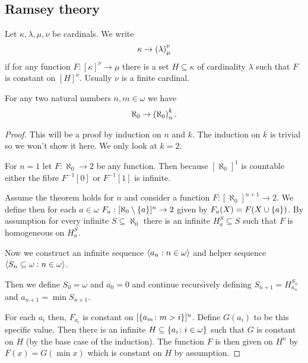 \subsection{Ramsey theory}

\begin{definition}
    Let \(\kappa,\lambda,\mu,\nu\) be cardinals. We write
    \[
        \kappa\to\left(\lambda\right)_{\mu}^{\nu}
    \]
    if for any function \(F:[\kappa]^{\nu}\to\mu\) there is a set
    \(H\subseteq\kappa\) of cardinality \(\lambda\) such that \(F\) is constant
    on \([H]^{\nu}\). Usually \(\nu\) is a finite cardinal.
\end{definition}

\begin{proposition}
    For any two natural numbers \(n,m\in\omega\) we have
    \[
        \aleph_{0}\to\left(\aleph_{0}\right)_{n}^{k}.
    \]

    \begin{proof}
        This will be a proof by induction on \(n\) and \(k\). The induction on
        \(k\) is trivial so we won't show it here. We only look at \(k=2\).

        For \(n=1\) let \(F:\aleph_{0}\to 2\) be any function. Then because
        \([\aleph_{0}]^{1}\) is countable either the fibre \(F^{-1}[0]\) or
        \(F^{-1}[1]\) is infinite.

        Assume the theorem holds for \(n\) and consider a function
        \(F:[\aleph_{0}]^{n+1}\to 2\). We define then for each \(a\in\omega\)
        \(F_{a}:[\aleph_{0}\setminus\left\{a\right\}]^{n}\to 2\) given by
        \(F_{a}(X)=F(X\cup\left\{a\right\})\). By assumption for every infinite
        \(S\subseteq\aleph_{0}\) there is an infinite \(H^{S}_{a}\subseteq S\)
        such that \(F\) is homogeneous on \(H^{S}_{a}\).

        Now we construct an infinite sequence \(\left<a_{n}:n\in\omega\right>\)
        and helper sequence \(\left<S_{n}\subseteq\omega:n\in\omega\right>\).

        Then we define \(S_{0}=\omega\) and \(a_{0}=0\) and continue recursively
        defining \(S_{n+1}=H^{S_{n}}_{a_{n}}\) and \(a_{n+1}=\min S_{n+1}\).

        For each \(a_{i}\) then, \(F_{a_{i}}\) is constant on
        \([\left\{a_{m}\colon m>i\right\}]^{n}\). Define \(G(a_{i})\) to be this specific
        value. Then there is an infinite
        \(H\subseteq\left\{a_{i}\colon i\in\omega\right\}\) such that \(G\) is constant on
        \(H\) (by the base case of the induction). The function \(F\) is then
        given on \(H^{n}\) by \(F(x)=G(\min x)\) which is constant on \(H\)
        by assumption.
    \end{proof}
\end{proposition}

